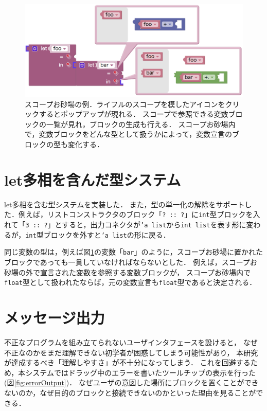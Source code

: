 \begin{figure}[h]
 \centering
 \includegraphics[keepaspectratio, scale=0.3]{img/osunaba3.png}
 \caption{スコープお砂場の例．ライフルのスコープを模したアイコンをクリックするとポップアップが現れる．
スコープで参照できる変数ブロックの一覧が見れ，ブロックの生成も行える．
スコープお砂場内で，変数ブロックをどんな型として扱うかによって，変数宣言のブロックの型も変化する．\label{fig:osunaba}}
\end{figure}

\section {let多相を含んだ型システム}

let多相を含む型システムを実装した．
また，型の単一化の解除をサポートした．例えば，リストコンストラクタのブロック「{\tt ?\ ::\ ?}」に{\tt int}型ブロックを入れて「{\tt 3 ::\ ?}」とすると，出力コネクタが{\tt 'a list}から{\tt int list}を表す形に変わるが，{\tt int}型ブロックを外すと{\tt 'a list}の形に戻る．

同じ変数の型は，例えば図\ref{fig:osunaba}の変数「{\tt bar}」のように，スコープお砂場に置かれたブロックであっても一貫していなければならないとした．
例えば，スコープお砂場の外で宣言された変数を参照する変数ブロックが，
スコープお砂場内で{\tt float}型として扱われたならば，元の変数宣言も{\tt float}型であると決定される．

\section {メッセージ出力\label{fun:message}}

不正なプログラムを組み立てられないユーザインタフェースを設けると，
なぜ不正なのかをまだ理解できない初学者が困惑してしまう可能性があり，
本研究が達成するべき「理解しやすさ」が不十分になってしまう．
これを回避するため，本システムではドラッグ中のエラーを書いたツールチップの表示を行った(図\ref{fig:errorOutput})．
なぜユーザの意図した場所にブロックを置くことができないのか，なぜ目的のブロックと接続できないのかといった理由を見ることができる．

